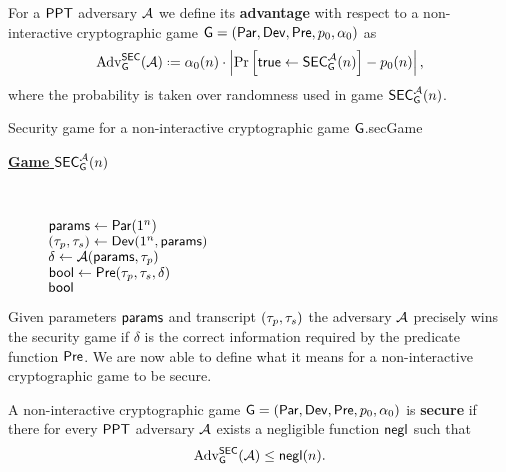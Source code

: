 \begin{defn}
	For a $\mathsf{PPT}$ adversary $\mathcal{A}$ we define its \textbf{advantage} with respect to a non-interactive cryptographic game $\operatorname{\mathsf{G}}=\left(\operatorname{\mathsf{Par}},\operatorname{\mathsf{Dev}},\operatorname{\mathsf{Pre}},p_{0},\alpha_{0}\right)$ as
	\begin{align*}
		\adv_{\cgame}^{\secgame}(\adve)\defeq \secf(n)\cdot\left\vert \prob{\true \leftarrow \secgame_{\cgame}^{\adve}(n)}-\basep(n)\right\vert,
	\end{align*}
where the probability is taken over randomness used in game $\mathsf{SEC}_{\operatorname{\mathsf{G}}}^{\mathcal{A}}(n)$.
\end{defn}

\begin{comment}
	\begin{align*}
		\adv_{\cgame}(\adve)\defeq \secf(n)\left\vert \proprob{\params\leftarrow\param(1^n),\,(\ptrans,\strans)\leftarrow \dev\left(1^n,\params\right)}{\true\leftarrow \pred\left(\ptrans,\strans,\adve(\params,\ptrans)\right)}-\basep(n)\right\vert
	\end{align*}
\end{comment}

\begin{boxfigGame}{Security game for a non-interactive cryptographic game $\operatorname{\mathsf{G}}$.}{secGame}
  \begin{description}
	\item[\underline{\textbf{Game} $\mathsf{SEC}_{\operatorname{\mathsf{G}}}^{\mathcal{A}}(n)$}] ~
 	
 		$\mathsf{params} \leftarrow \operatorname{\mathsf{Par}}(1^n)$ \\
 		$(\tau_p,\tau_s)\leftarrow \operatorname{\mathsf{Dev}}(1^n,\mathsf{params})$ \\
 		$\delta \leftarrow \mathcal{A}(\mathsf{params},\tau_p)$ \\
 		$\mathsf{bool} \leftarrow \operatorname{\mathsf{Pre}}(\tau_p,\tau_s,\delta)$ \\
		\Ret $\mathsf{bool}$	
  \end{description}
\end{boxfigGame}


Given parameters $\mathsf{params}$ and transcript $(\tau_p,\tau_s)$ the adversary $\mathcal{A}$ precisely wins the security game if $\delta$ is the correct information required by the predicate function $\operatorname{\mathsf{Pre}}$.  We are now able to define what it means for a non-interactive cryptographic game to be secure. 
\begin{defn}
	A non-interactive cryptographic game $\operatorname{\mathsf{G}}=\left(\operatorname{\mathsf{Par}},\operatorname{\mathsf{Dev}},\operatorname{\mathsf{Pre}},p_{0},\alpha_{0}\right)$ is \textbf{secure} if there for every $\mathsf{PPT}$ adversary $\mathcal{A}$ exists a negligible function $\operatorname{\mathsf{negl}}$ such that 
	\begin{align*}
		\operatorname{Adv}_{\operatorname{\mathsf{G}}}^{\mathsf{SEC}}(\mathcal{A})\leq \operatorname{\mathsf{negl}}(n).
	\end{align*} 
\end{defn}


